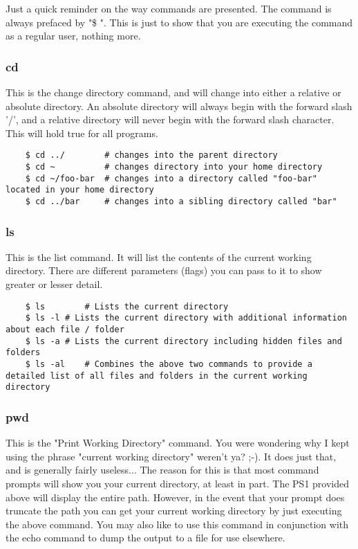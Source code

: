 Just a quick reminder on the way commands are presented.  The command is always prefaced by "\$ ".  This is just to show that you are executing the command as a regular user, nothing more.

\subsubsection{cd} \mdseries
This is the change directory command, and will change into either a relative or absolute directory.  An absolute directory will always begin with the forward slash '/', and a relative directory will never begin with the forward slash character.  This will hold true for all programs.

	\begin{lstlisting}
	$ cd ../		# changes into the parent directory
	$ cd ~			# changes directory into your home directory
	$ cd ~/foo-bar	# changes into a directory called "foo-bar" located in your home directory
	$ cd ../bar		# changes into a sibling directory called "bar"
	\end{lstlisting}

\subsubsection{ls} \mdseries
This is the list command.  It will list the contents of the current working directory.  There are different parameters (flags) you can pass to it to show greater or lesser detail.
	
	\begin{lstlisting}
	$ ls		# Lists the current directory
	$ ls -l	# Lists the current directory with additional information about each file / folder
	$ ls -a	# Lists the current directory including hidden files and folders
	$ ls -al	# Combines the above two commands to provide a detailed list of all files and folders in the current working directory
	\end{lstlisting}

\subsubsection{pwd} \mdseries
This is the "Print Working Directory" command.  You were wondering why I kept using the phrase "current working directory" weren't ya? ;-).  It does just that, and is generally fairly useless...  The reason for this is that most command prompts will show you your current directory, at least in part.  The PS1 provided above will display the entire path.  However, in the event that your prompt does truncate the path you can get your current working directory by just executing the above command.  You may also like to use this command in conjunction with the echo command to dump the output to a file for use elsewhere.

